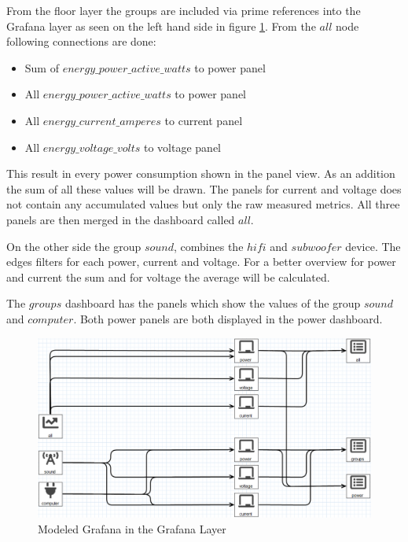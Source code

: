 From the floor layer the groups are included via prime references into the Grafana layer as seen on the left hand side in figure \ref{fig:modelGrafanaLayer}. From the $all$ node following connections are done:

\begin{itemize}
	\item Sum of $energy\_power\_active\_watts$ to power panel
	\item All $energy\_power\_active\_watts$ to power panel
	\item All $energy\_current\_amperes$ to current panel
 	\item All $energy\_voltage\_volts$ to voltage panel
\end{itemize}

This result in every power consumption shown in the panel view. As an addition the sum of all these values will be drawn. The panels for current and voltage does not contain any accumulated values but only the raw measured metrics. All three panels are then merged in the dashboard called $all$.

On the other side the group $sound$, combines the $hifi$ and $subwoofer$ device. The edges filters for each power, current and voltage. For a better overview for power and current the sum and for voltage the average will be calculated. 

The $groups$ dashboard has the panels which show the values of the group $sound$ and $computer$. Both power panels are both displayed in the power dashboard.

\begin{figure}[H]
	\centering 
	\includegraphics[width=\linewidth]{assets/images/grafanaLayer}
	\caption{Modeled Grafana in the Grafana Layer}
	\label{fig:modelGrafanaLayer}
\end{figure}

